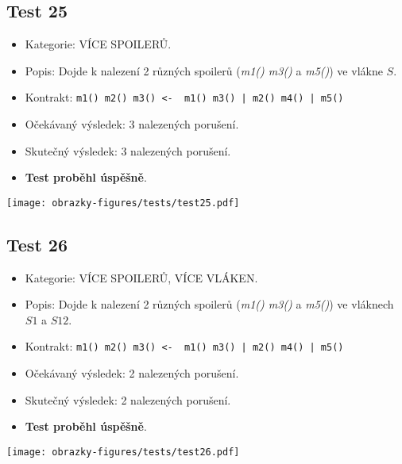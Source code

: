 \subsection*{Test 25}
\begin{itemize}
\item Kategorie: VÍCE SPOILERŮ.
\item Popis: Dojde k nalezení 2 různých spoilerů (\textit{m1() m3()} a \textit{m5()}) ve vlákne $S$. 
\item Kontrakt: \texttt{m1() m2() m3() <- { m1() m3() | m2() m4() | m5() }}
\item Očekávaný výsledek: 3 nalezených porušení.

\item Skutečný výsledek: 3 nalezených porušení.
\item \textbf{Test proběhl úspěšně}.
\end{itemize}
\begin{center}
    \centering
    \texttt{[image: obrazky-figures/tests/test25.pdf]}
    \label{test25}
\end{center}

\subsection*{Test 26}
\begin{itemize}
\item Kategorie: VÍCE SPOILERŮ, VÍCE VLÁKEN.
\item Popis: Dojde k nalezení 2 různých spoilerů (\textit{m1() m3()} a \textit{m5()}) ve vláknech $S1$ a $S12$. 
\item Kontrakt: \texttt{m1() m2() m3() <- { m1() m3() | m2() m4() | m5() }}
\item Očekávaný výsledek: 2 nalezených porušení.

\item Skutečný výsledek: 2 nalezených porušení.
\item \textbf{Test proběhl úspěšně}.
\end{itemize}
\begin{center}
    \centering
    \texttt{[image: obrazky-figures/tests/test26.pdf]}
    \label{test26}
\end{center}

